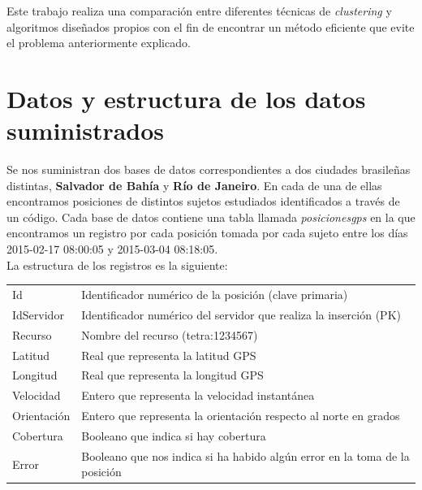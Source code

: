 \documentclass[a4paper, 12pt]{article}
\begin{document}
Este trabajo realiza una comparaci\'on entre diferentes t\'ecnicas de \textit{clustering} y algoritmos dise\~nados propios con el fin de encontrar un m\'etodo eficiente que evite el problema anteriormente explicado. 

\pagebreak

\section{Datos y estructura de los datos suministrados}

Se nos suministran dos bases de datos correspondientes a dos ciudades brasile\~nas distintas, \textbf{Salvador de Bah\'ia} y \textbf{R\'io de Janeiro}. En cada de una de ellas encontramos posiciones de distintos sujetos estudiados identificados a trav\'es de un c\'odigo. Cada base de datos contiene una tabla llamada \textit{posicionesgps} en la que encontramos un registro por cada posici\'on tomada por cada sujeto entre los d\'ias 2015-02-17 08:00:05 y 2015-03-04 08:18:05. \\

La estructura de los registros es la siguiente:\\

\begin{center}
	\begin{tabular}{| l | l  |}
	\hline
	\rowcolor{LightCyan}
	\hline
  		\multicolumn{2}{|l|}{Par\'ametros} \\
	\hline
	Id & Identificador num\'erico de la posici\'on (clave primaria) \\
	IdServidor & Identificador num\'erico del servidor que realiza la inserci\'on (PK) \\
	Recurso & Nombre del recurso (tetra:1234567) \\
	Latitud & Real que representa la latitud GPS \\
	Longitud & Real que representa la longitud GPS \\
		Velocidad & Entero que representa la velocidad instant\'anea \\
	Orientaci\'on & Entero que representa la orientaci\'on respecto al norte en grados \\
	Cobertura & Booleano que indica si hay cobertura \\
	Error & Booleano que nos indica si ha habido alg\'un error en la toma de la posici\'on \\
	\hline
	\end{tabular}

\end{center}
\end{document}
